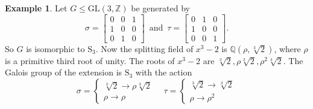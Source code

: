 \documentclass{article}
\theoremstyle{plain}
\theoremstyle{definition}
\newtheorem{example}[theorem]{Example}
\newcommand{\Z}{\ensuremath{\mathbb{Z}}}
\newcommand{\Q}{\ensuremath{\mathbb{Q}}}
\begin{document}
\noindent
\begin{example}
Let $G \leq \mathrm{GL}(3,\Z)$ be generated by $$\sigma = \begin{bmatrix}
0 & 0 &1\\
1 & 0 &0\\
0 & 1 & 0
\end{bmatrix}\,\,\, \text{and} \,\,\, \tau = \begin{bmatrix}
0 & 1 &0\\
1 & 0 &0\\
0 & 0 & 1
\end{bmatrix}.$$
So $G$ is isomorphic to $\mathrm{S}_3$. 
Now the splitting field of $x^3-2$ is $\Q(\rho, \sqrt[3]{2})$, where $\rho$ is a primitive third root of unity. The roots of $x^3-2$ are $\sqrt[3]{2},\rho \sqrt[3]{2}, \rho^2 \sqrt[3]{2}$. The Galois group of the extension is $\mathrm{S}_3$ with the action $$\sigma = \begin{cases} \sqrt[3]{2}\longrightarrow \rho \sqrt[3]{2} \\ \rho \longrightarrow \rho \end{cases}\,\,\, \,\,\,\tau = \begin{cases} \sqrt[3]{2}\longrightarrow \sqrt[3]{2} \\ \rho \longrightarrow \rho^2 \end{cases}$$
%
%
%

\end{example}
\end{document}
